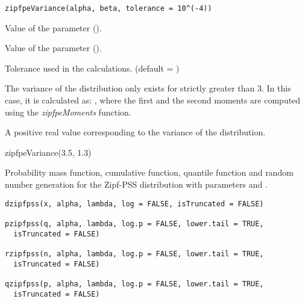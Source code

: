 \documentclass[letterpaper]{book}
\begin{document}
%
\begin{Usage}
\begin{verbatim}
zipfpeVariance(alpha, beta, tolerance = 10^(-4))
\end{verbatim}
\end{Usage}
%
\begin{Arguments}
\begin{ldescription}
\item[\code{alpha}] Value of the \eqn{\alpha}{} parameter ().

\item[\code{beta}] Value of the \eqn{\beta}{} parameter (\eqn{\beta \in (-\infty, +\infty)}{}).

\item[\code{tolerance}] Tolerance used in the calculations. (default = )
\end{ldescription}
\end{Arguments}
%
\begin{Details}\relax
The variance of the distribution only exists for \eqn{\alpha}{} strictly greater than 3.
In this case, it is calculated as:
,
where the first and the second moments are computed using the \emph{zipfpeMoments} function.
\end{Details}
%
\begin{Value}
A positive real value corresponding to the variance of the distribution.
\end{Value}
%
\begin{Examples}
\begin{ExampleCode}
zipfpeVariance(3.5, 1.3)
\end{ExampleCode}
\end{Examples}
%
\begin{Description}\relax
Probability mass function, cumulative function, quantile function and random number generation
for the Zipf-PSS distribution with parameters \eqn{\alpha}{} and \eqn{\lambda}{}.
\end{Description}
%
\begin{Usage}
\begin{verbatim}
dzipfpss(x, alpha, lambda, log = FALSE, isTruncated = FALSE)

pzipfpss(q, alpha, lambda, log.p = FALSE, lower.tail = TRUE,
  isTruncated = FALSE)

rzipfpss(n, alpha, lambda, log.p = FALSE, lower.tail = TRUE,
  isTruncated = FALSE)

qzipfpss(p, alpha, lambda, log.p = FALSE, lower.tail = TRUE,
  isTruncated = FALSE)
\end{verbatim}
\end{Usage}
\end{document}
